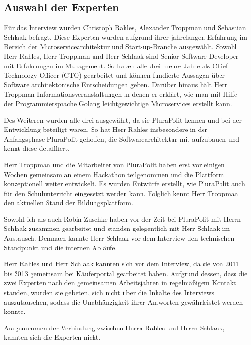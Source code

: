 \subsection{Auswahl der Experten}

Für das Interview wurden Christoph Rahles, Alexander Troppman und Sebastian Schlaak befragt.
Diese Experten wurden aufgrund ihrer jahrelangen Erfahrung im Bereich der Microservicearchitektur und Start-up-Branche ausgewählt. Sowohl Herr Rahles, Herr Troppman und Herr Schlaak sind Senior Software Developer mit Erfahrungen im Management. So haben alle drei mehre Jahre als Chief Technology Officer (CTO) gearbeitet und können fundierte Aussagen über Software architektonische Entscheidungen geben. Darüber hinaus hält Herr Troppman Informationsveranstaltungen in denen er erklärt, wie man mit Hilfe der Programmiersprache Golang leichtgewichtige Microservices erstellt kann.


Des Weiteren wurden alle drei ausgewählt, da sie PluraPolit kennen und bei der Entwicklung beteiligt waren. So hat Herr Rahles insbesondere in der Anfangsphase PluraPolit geholfen, die Softwarearchitektur mit aufzubauen und kennt diese detailliert.

Herr Troppman und die Mitarbeiter von PluraPolit haben erst vor einigen Wochen gemeinsam an einem Hackathon teilgenommen und die Plattform konzeptionell weiter entwickelt. Es wurden Entwürfe erstellt, wie PluraPolit auch für den Schulunterricht eingesetzt werden kann. Folglich kennt Herr Troppman den aktuellen Stand der Bildungsplattform.

Sowohl ich als auch Robin Zuschke haben vor der Zeit bei PluraPolit mit Herrn Schlaak zusammen gearbeitet und standen gelegentlich mit Herr Schlaak im Austausch. Demnach kannte Herr Schlaak vor dem Interview den technischen Standpunkt und die internen Abläufe.

Herr Rahles und Herr Schlaak kannten sich vor dem Interview, da sie von 2011 bis 2013 gemeinsam bei Käuferportal gearbeitet haben. Aufgrund dessen, dass die zwei Experten nach den gemeinsamen Arbeitsjahren in regelmäßigem Kontakt standen, wurden sie gebeten, sich nicht über die Inhalte des Interviews auszutauschen, sodass die Unabhängigkeit ihrer Antworten gewährleistet werden konnte.

Ausgenommen der Verbindung zwischen Herrn Rahles und Herrn Schlaak, kannten sich die Experten nicht.
